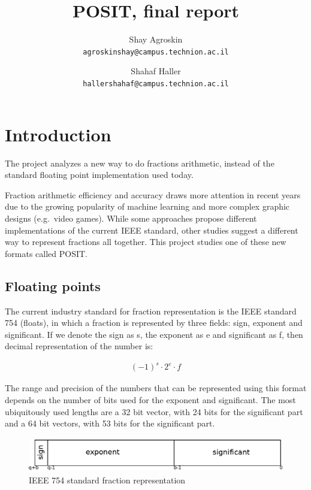 \documentclass[10pt]{article}
\title{POSIT, final report}
\author{
  Shay Agroskin \\
  \texttt{agroskinshay@campus.technion.ac.il}
  \and
  Shahaf Haller \\
  \texttt{hallershahaf@campus.technion.ac.il}
}
\begin{document}
\maketitle

\tableofcontents

\pagebreak

\section{Introduction}\label{sec:introduction}

The project analyzes a new way to do fractions arithmetic, instead of
the standard floating point implementation used today.

Fraction arithmetic efficiency and accuracy draws more attention in recent years
due to the growing popularity of machine learning and more complex graphic
designs (e.g.\ video games). While some approaches propose different
implementations of the current IEEE standard, other studies suggest a different
way to represent fractions all together.
This project studies one of these new formats called POSIT.

\subsection{Floating points}\label{sec:floatingpoints}

The current industry standard for fraction representation is the IEEE standard
754 (floats), in which a fraction is represented by three fields: sign, exponent
and significant. If we denote the sign as s, the exponent as e and significant
as f, then decimal representation of the number is:


\begin{align}
  {(-1)}^{s} \cdot 2^{e} \cdot f\label{eq:1} 
\end{align}

The range and precision of the numbers that can be represented using this format
depends on the number of bits used for the exponent and significant. The most
ubiquitously used lengths are a 32 bit vector, with 24 bits for the significant
part and a 64 bit vectors, with 53 bits for the significant part.

\begin{figure}[h]
  \centering
  \includegraphics*[width=\textwidth, height=1.5cm]{ieee_754_format}
  \caption{IEEE 754 standard fraction representation}\label{fig:ieee754}
\end{figure}
\end{document}
